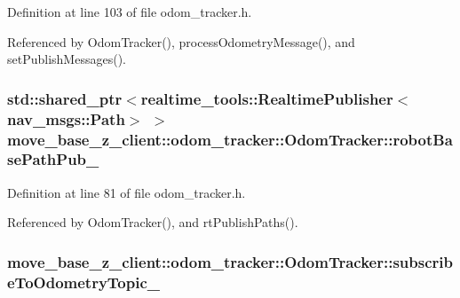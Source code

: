 Definition at line 103 of file odom\+\_\+tracker.\+h.



Referenced by Odom\+Tracker(), process\+Odometry\+Message(), and set\+Publish\+Messages().

\subsubsection[{\texorpdfstring{robot\+Base\+Path\+Pub\+\_\+}{robotBasePathPub_}}]{\setlength{\rightskip}{0pt plus 5cm}std\+::shared\+\_\+ptr$<$realtime\+\_\+tools\+::\+Realtime\+Publisher$<$nav\+\_\+msgs\+::\+Path$>$ $>$ move\+\_\+base\+\_\+z\+\_\+client\+::odom\+\_\+tracker\+::\+Odom\+Tracker\+::robot\+Base\+Path\+Pub\+\_\+\hspace{0.3cm}{\ttfamily [protected]}}\hypertarget{classmove__base__z__client_1_1odom__tracker_1_1OdomTracker_a3eb6ca9be9504dc3c1da949d1e1daeda}{}\label{classmove__base__z__client_1_1odom__tracker_1_1OdomTracker_a3eb6ca9be9504dc3c1da949d1e1daeda}


Definition at line 81 of file odom\+\_\+tracker.\+h.



Referenced by Odom\+Tracker(), and rt\+Publish\+Paths().

\subsubsection[{\texorpdfstring{subscribe\+To\+Odometry\+Topic\+\_\+}{subscribeToOdometryTopic_}}]{ move\+\_\+base\+\_\+z\+\_\+client\+::odom\+\_\+tracker\+::\+Odom\+Tracker\+::subscribe\+To\+Odometry\+Topic\+\_\+\hspace{0.3cm}{\ttfamily [protected]}}\hypertarget{classmove__base__z__client_1_1odom__tracker_1_1OdomTracker_af07071223326ba38fc95037717102bb4}{}\label{classmove__base__z__client_1_1odom__tracker_1_1OdomTracker_af07071223326ba38fc95037717102bb4}


